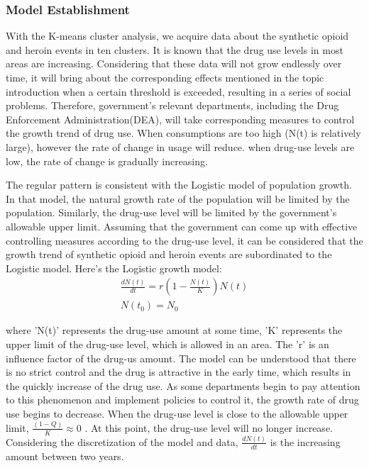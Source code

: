 \documentclass[11pt]{article}
\begin{document}
\subsubsection{Model Establishment}
With the K-means cluster analysis, we acquire data about the synthetic opioid and heroin events in ten clusters. It is known that the drug use levels in most areas are increasing. Considering that these data will not grow endlessly over time, it will bring about the corresponding effects mentioned in the topic introduction when a certain threshold is exceeded, resulting in a series of social problems. Therefore, government’s relevant departments, including the Drug Enforcement Administration(DEA), will take corresponding measures to control the growth trend of drug use. When consumptions are too high (N(t) is relatively large), however the rate of change in usage will reduce. when drug-use levels are low, the rate of change is gradually increasing.

The regular pattern is consistent with the Logistic model of population growth. In that model, the natural growth rate of the population will be limited by the population. Similarly, the drug-use level will be limited by the government’s allowable upper limit. Assuming that the government can come up with effective controlling measures according to the drug-use level, it can be considered that the growth trend of synthetic opioid and heroin events are subordinated to the Logistic model. Here’s the Logistic growth model:
\begin{gather}
	\frac{dN(t)}{dt} = r(1-\frac{N(t)}{K})N(t) \\
	N(t_{0}) = N_{0}
\end{gather}

where 'N(t)' represents the drug-use amount at some time, 'K' represents the upper limit of the drug-use level, which is allowed in an area. The 'r' is an influence factor of the drug-us amount. The model can be understood that there is no strict control and the drug is attractive in the early time, which results in the quickly increase of the drug use. As some departments begin to pay attention to this phenomenon and implement policies to control it, the growth rate of drug use begins to decrease. When the drug-use level is close to the allowable upper limit, $\frac{(1-Q)}{K} \approx 0$ . At this point, the drug-use level will no longer increase. Considering the discretization of the model and data, $\frac{dN(t)}{dt}$ is the increasing amount between two years.
\end{document}
